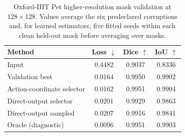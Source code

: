 \begin{table}[t]
\centering
\caption{Oxford-IIIT Pet higher-resolution mask validation at ${128}\times{128}$. Values average the six predeclared corruptions and, for learned estimators, five fitted seeds within each clean held-out mask before averaging over masks.}
\label{tab:oxfordpet}
\small
\begin{tabular}{lccc}
\toprule
Method & Loss $\downarrow$ & Dice $\uparrow$ & IoU $\uparrow$\\
\midrule
Input & 0.4482 & 0.9037 & 0.8336\\
Validation best & 0.0164 & 0.9950 & 0.9902\\
Action-coordinate selector & 0.0162 & 0.9951 & 0.9904\\
Direct-output selector & 0.0201 & 0.9929 & 0.9863\\
Direct-output sampled & 0.0207 & 0.9916 & 0.9841\\
Oracle (diagnostic) & 0.0096 & 0.9951 & 0.9903\\
\bottomrule
\end{tabular}
\end{table}


